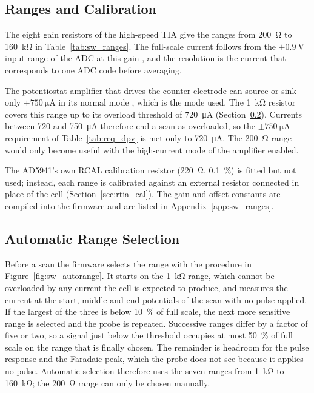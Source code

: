\subsection{Ranges and Calibration}
\label{sec:sw_ranges}

The eight gain resistors of the high-speed TIA give the ranges from \SI{200}{\ohm} to \SI{160}{\kilo\ohm} in Table~\ref{tab:sw_ranges}. The full-scale current follows from the
$\pm\SI{0.9}{\volt}$ input range of the ADC at this gain
\cite[p.~8]{ad5941_ds}, and the resolution is the current that corresponds to
one ADC code before averaging.

The potentiostat amplifier that drives the counter electrode
can source or sink only $\pm\SI{750}{\micro\ampere}$ in its normal mode
\cite[p.~9]{ad5941_ds}, which is the mode used. The \SI{1}{\kilo\ohm} resistor covers this range up to its overload threshold of \SI{720}{\micro\ampere}
(Section~\ref{sec:sw_ranging}). Currents between 720 and \SI{750}{\micro\ampere} therefore end a scan as overloaded, so the $\pm\SI{750}{\micro\ampere}$ requirement of Table~\ref{tab:req_dpv} is met only to \SI{720}{\micro\ampere}. The \SI{200}{\ohm} range would only become
useful with the high-current mode of the amplifier enabled.

The AD5941's own RCAL calibration resistor (\SI{220}{\ohm}, \SI{0.1}{\percent}) is fitted but not used; instead, each range is calibrated against an external resistor connected in place of the cell (Section~\ref{sec:rtia_cal}). The gain and offset constants are compiled into the firmware and are listed in Appendix~\ref{app:sw_ranges}.

\subsection{Automatic Range Selection}
\label{sec:sw_ranging}

Before a scan the firmware selects the range with the procedure in
Figure~\ref{fig:sw_autorange}. It starts on the \SI{1}{\kilo\ohm} range, which
cannot be overloaded by any current the cell is expected to produce, and
measures the current at the start, middle and end potentials of the scan with
no pulse applied. If the largest of the three is below \SI{10}{\percent} of
full scale, the next more sensitive range is selected and the probe is
repeated. Successive ranges differ by a factor of five or two, so a signal
just below the threshold occupies at most \SI{50}{\percent} of full scale on
the range that is finally chosen. The remainder is headroom for the pulse
response and the Faradaic peak, which the probe does not see because it
applies no pulse. Automatic selection therefore uses the seven ranges from \SI{1}{\kilo\ohm} to \SI{160}{\kilo\ohm}; the \SI{200}{\ohm} range can only be chosen manually.

